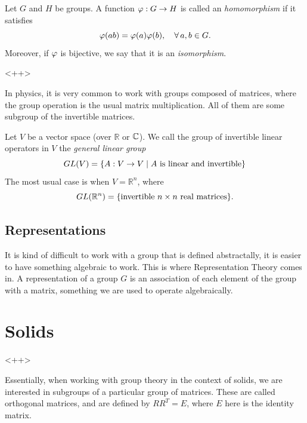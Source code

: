 \begin{definition}
Let $G$ and $H$ be groups. A function $\varphi: G \to H$ is called an \textit{homomorphism} if it satisfies
$$
\varphi(a b) = \varphi(a) \varphi(b), \quad \forall \, a,b \in G.
$$
Moreover, if $\varphi$ is bijective, we say that it is an \textit{isomorphism}.
\end{definition}

<++>




In physics, it is very common to work with groups composed of matrices, where the group operation is the usual matrix multiplication. All of them are some subgroup of the invertible matrices.

\begin{definition}
Let $V$ be a vector space (over $\mathbb{R}$ or ${\mathbb{C}}$). We call the group of invertible linear operators in $V$ the \textit{general linear group}
$$
GL(V) = \qty{A: V \to V \mid A \text{ is linear and invertible}}
$$
The most usual case is when $V = \mathbb{R}^n$, where
$$
GL(\mathbb{R}^n) = \qty{\text{invertible } n\times n \text{ real matrices}}.
$$
\end{definition}

\subsection{Representations}

It is kind of difficult to work with a group that is defined abstractally, it is easier to have something algebraic to work. This is where Representation Theory comes in. A representation of a group $G$ is an association of each element of the group with a matrix, something we are used to operate algebraically.

\section{Solids}

<++>

\n

Essentially, when working with group theory in the context of solids, we are interested in subgroups of a particular group of matrices. These are called orthogonal matrices, and are defined by $R R^T = E$, where $E$ here is the identity matrix.

